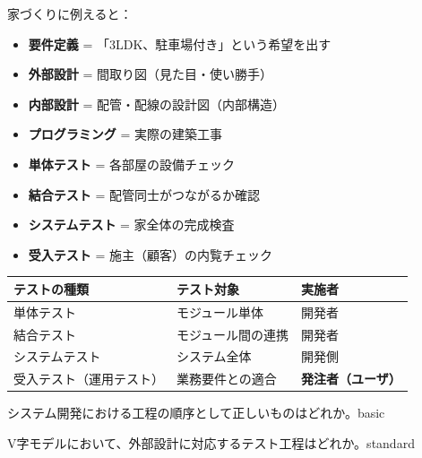 \begin{analogy}
家づくりに例えると：
\begin{itemize}
  \item \textbf{要件定義} = 「3LDK、駐車場付き」という希望を出す
  \item \textbf{外部設計} = 間取り図（見た目・使い勝手）
  \item \textbf{内部設計} = 配管・配線の設計図（内部構造）
  \item \textbf{プログラミング} = 実際の建築工事
  \item \textbf{単体テスト} = 各部屋の設備チェック
  \item \textbf{結合テスト} = 配管同士がつながるか確認
  \item \textbf{システムテスト} = 家全体の完成検査
  \item \textbf{受入テスト} = 施主（顧客）の内覧チェック
\end{itemize}
\end{analogy}

\begin{comparison}
\begin{tabularx}{\textwidth}{lXX}
  \toprule
  \textbf{テストの種類} & \textbf{テスト対象} & \textbf{実施者} \\
  \midrule
  単体テスト & モジュール単体 & 開発者 \\
  結合テスト & モジュール間の連携 & 開発者 \\
  システムテスト & システム全体 & 開発側 \\
  受入テスト（運用テスト） & 業務要件との適合 & \textbf{発注者（ユーザ）} \\
  \bottomrule
\end{tabularx}
\end{comparison}


\begin{mondai}{システム開発における工程の順序として正しいものはどれか。}{basic}
\end{mondai}

\begin{mondai}{V字モデルにおいて、外部設計に対応するテスト工程はどれか。}{standard}
\end{mondai}

